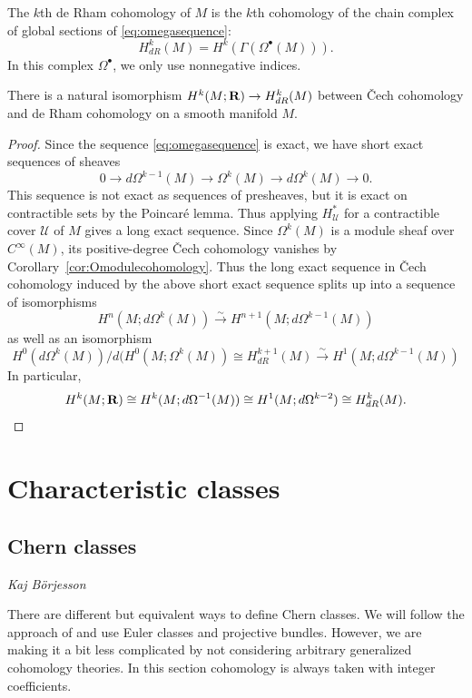 \documentclass[a4paper,openany]{scrbook}
\newcommand{\chapterauthor}[1]{\hfill\emph{#1}\par\noindent}
\begin{document}
\begin{defn}
The $k$th de Rham cohomology of $M$ is the $k$th cohomology of the chain complex of global sections of \eqref{eq:omegasequence}:
\[
H^k_{dR}(M) = H^k(\Gamma(\Omega^\bullet(M))).
\]
In this complex $\Omega^\bullet$, we only use nonnegative indices.
\end{defn}

\begin{thm}
There is a natural isomorphism $H^k(M;\mathbf R) \to H^k_{dR}(M)$ between \v Cech cohomology and de Rham cohomology on a smooth manifold $M$.
\end{thm}
\begin{proof}
Since the sequence \eqref{eq:omegasequence} is exact, we have short exact sequences of sheaves
\[
0 \to d\Omega^{k-1}(M) \to \Omega^k(M) \to d\Omega^k(M) \to 0.
\]
This sequence is not exact as sequences of presheaves, but it is exact on contractible sets by the Poincaré lemma. Thus applying $H^*_{\mathcal U}$ for a contractible cover $\mathcal U$ of $M$ gives a long exact sequence. Since $\Omega^k(M)$ is a module sheaf over $C^\infty(M)$, its positive-degree \v Cech cohomology vanishes by Corollary~\ref{cor:Omodulecohomology}. Thus the long exact sequence in \v Cech cohomology induced by the above short exact sequence splits up into a sequence of isomorphisms
\[
H^n(M;d\Omega^k(M)) \xrightarrow{\sim} H^{n+1}(M;d\Omega^{k-1}(M))
\]
as well as an isomorphism
\[
H^0(d\Omega^k(M))/d(H^0(M;\Omega^{k}(M)) \cong H^{k+1}_{dR}(M) \xrightarrow{\sim} H^1(M;d\Omega^{k-1}(M)) 
\]
In particular,
\[
H^k(M;\mathbf R) \cong H^k(M;d\Omega^{-1}(M)) \cong H^1(M;d\Omega^{k-2}) \cong H^k_{dR}(M).
\]
\end{proof}

\chapter{Characteristic classes}

\section{Chern classes}\label{sec:chernclasses}
\chapterauthor{Kaj Börjesson}

There are different but equivalent ways to define Chern classes. We will follow the approach of \cite{tomdieck:algebraic-topology} and use Euler classes and projective bundles. However, we are making it a bit less complicated by not considering arbitrary generalized cohomology theories. In this section cohomology is always taken with integer coefficients.
\end{document}
